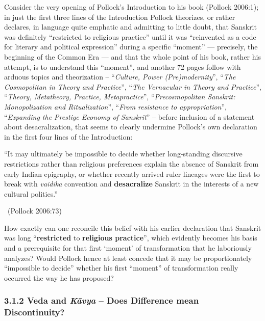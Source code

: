 Consider the very opening of Pollock’s Introduction to his book (Pollock 2006:1); in just the first three lines of the Introduction Pollock theorizes, or rather declares, in language quite emphatic and admitting to little doubt, that Sanskrit was definitely “restricted to religious practice” until it was “reinvented as a code for literary and political expression” during a specific “moment” — precisely, the beginning of the Common Era — and that the whole point of his book, rather his attempt, is to understand this “moment”, and another 72 pages follow with arduous topics and theorization – “\textit{Culture, Power (Pre)modernity}”, “\textit{The Cosmopolitan in Theory and Practice}”, “\textit{The Vernacular in Theory and Practice}”, “\textit{Theory, Metatheory, Practice, Metapractice}”, “\textit{Precosmopolitan Sanskrit: Monopolization and Ritualization}”, “\textit{From resistance to appropriation}”, “\textit{Expanding the Prestige Economy of Sanskrit}” – before inclusion of a statement about desacralization, that seems to clearly undermine Pollock’s own declaration in the first four lines of the Introduction:

\begin{myquote}
“It may ultimately be impossible to decide whether long-standing discursive restrictions rather than religious preferences explain the absence of Sanskrit from early Indian epigraphy, or whether recently arrived ruler lineages were the first to break with \textit{vaidika} convention and \textbf{desacralize} Sanskrit in the interests of a new cultural politics.” 

~\hfill (Pollock 2006:73)
\end{myquote}

How exactly can one reconcile this belief with his earlier declaration that Sanskrit was long “\textbf{restricted} to \textbf{religious practice}”, which evidently becomes his basis and a prerequisite for that first ‘moment’ of transformation that he laboriously analyzes? Would Pollock hence at least concede that it may be proportionately “impossible to decide” whether his first “moment” of transformation really occurred the way he has proposed?


\subsubsection*{3.1.2 Veda and \textit{Kāvya} – Does Difference mean Discontinuity?}


